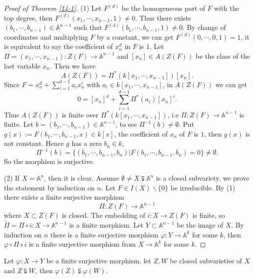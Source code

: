 \begin{proof}[Proof of Theorem \ref{14-1}]
	(1) Let $ F^{(d)} $ be the homogeneous part of $ F $ with the top degree, then $ F^{(d)}(x_1,\cdots,x_{n-1},1)\neq 0 $. Thus there exists $ (b_1,\cdots,b_{n-1})\in \mathbb{A}^{n-1} $ such that $ F^{(d)}(b_1,\cdots,b_{n-1},1)\neq 0 $. By change of coordinates and multiplying $ F $ by a constant, we can get $ F^{(d)}(0,\cdots,0,1)=1 $, it is equivalent to say the coefficient of $ x_n^d $ in $ F $ is $ 1 $. Let $ \Pi=(x_1,\cdots,x_{n-1}):Z(F)\to \mathbb{A}^{n-1} $ and $ [x_n]\in A(Z(F)) $ be the class of the last variable $ x_n $. Then we have
	$$
		A(Z(F))=\Pi^\ast (k[x_1,\cdots,x_{n-1}])[x_n].
	$$
	Since $ F=x_n^d+\sum\limits_{i=1}^{d-1}a_ix_n^i $ with $ a_i\in k[x_1,\cdots,x_{n-1}] $, in $ A(Z(F)) $ we can get
	$$
		0=[x_n]^d+\sum\limits_{i=1}^{d-1}\Pi^\ast (a_i)[x_n]^i.
	$$
	Thus $ A(Z(F)) $ is finite over $ \Pi^\ast(k[x_1,\cdots,x_{n-1}]) $, i.e $ \Pi:Z(F)\to \mathbb{A}^{n-1} $ is finite. Let $ b=(b_1,\cdots,b_{n-1})\in \mathbb{A}^{n-1} $, to see $ \Pi^{-1}(b)\neq \emptyset $. Put $ g(x):=F(b_1,\cdots,b_{n-1},x)\in k[x] $, the coefficient of $ x_n $ of $ F $ is $ 1 $, then $ g(x) $ is not constant. Hence $ g $ has a zero $ b_n\in k $,
	$$
		\Pi^{-1}(b)=\lbrace (b_1,\cdots,b_{n-1},b_n)|F(b_1,\cdots,b_{n-1},b_n)=0 \rbrace \neq \emptyset.
	$$
	So the morphism is surjective.

	(2)	  If $ X=\mathbb{A}^{n} $, then it is clear. Assume $ \emptyset\neq X\subsetneqq\mathbb{A}^n $ is a closed subvariety, we prove the statement by induction on $ n $. Let $ F\in I(X)\backslash\lbrace 0 \rbrace $ be irreducible. By (1) there exists a finite surjective morphism
	$$
		\Pi:Z(F)\to \mathbb{A}^{n-1}
	$$
	where $ X\subset Z(F) $ is closed. The embedding of $ i:X\to Z(F) $ is finite, so $ \tilde{\Pi}=\Pi\circ i:X\to \mathbb{A}^{n-1} $ is a finite morphism. Let $ Y\subset \mathbb{A}^{n-1} $ be the image of $ X $. By induction on $ n $ there is a finite surjective morphism $ \varphi:Y\to \mathbb{A}^{k} $ for some $ k $, then $ \varphi\circ\Pi\circ i $ is a finite surjective morphism from $ X\to \mathbb{A}^{k} $ for some $ k $.

\end{proof}
\begin{lemma}\label{14-2}
	Let $ \varphi:X\to Y $ be a finite surjective morphism, let $ Z,W $ be closed subvarieties of $ X $ and $ Z\subsetneqq W $, then $ \varphi(Z)\subsetneqq \varphi(W) $.
\end{lemma}
